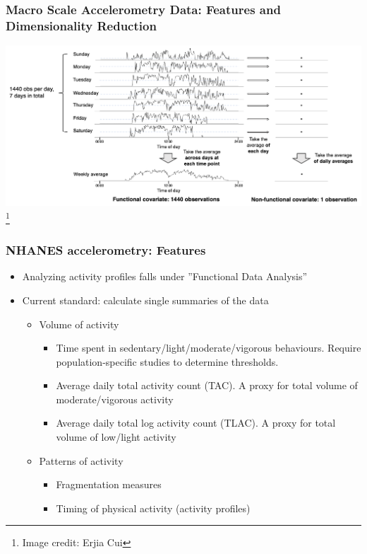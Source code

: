 \documentclass[10pt]{beamer}\usepackage[]{graphicx}\usepackage[]{color}
\newcommand\blfootnote[1]{%
  \begingroup
  \renewcommand\thefootnote{}\footnote{#1}%
  \addtocounter{footnote}{-1}%
  \endgroup
}
\begin{document}
\begin{frame}
\frametitle{Macro Scale Accelerometry Data: Features and Dimensionality Reduction}
\centering
\includegraphics[width=\textwidth]{data_reduction}
\blfootnote{Image credit: Erjia Cui}
\end{frame}



\begin{frame}
\frametitle{NHANES accelerometry: Features}
\begin{itemize}
\item Analyzing activity profiles falls under ''Functional Data Analysis''
\item Current standard: calculate single summaries of the data
    \begin{itemize}
    \item Volume of activity\footnotemark
        \begin{itemize}
        \item Time spent in sedentary/light/moderate/vigorous behaviours. Require population-specific studies to determine thresholds.
        \item Average daily total activity count (TAC). A proxy for total volume of moderate/vigorous activity
        \item Average daily total log activity count (TLAC). A proxy for total volume of low/light activity
        \end{itemize}
    \item Patterns of activity
        \begin{itemize}
        \item Fragmentation measures\footnotemark
        \item Timing of physical activity (activity profiles)
        \end{itemize}
    \end{itemize}
\end{itemize}
\end{frame}
\end{document}
